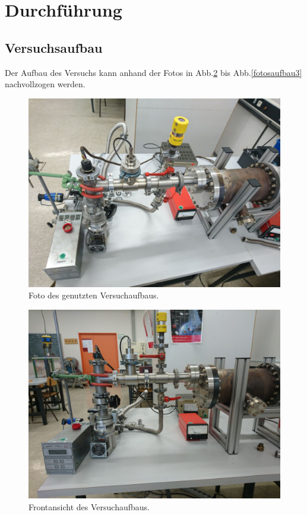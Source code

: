 \section{Durchführung}
\subsection{Versuchsaufbau}
Der Aufbau des Versuchs kann anhand der Fotos in Abb.\ref{fotosaufbau1} bis Abb.\ref{fotosaufbau3} nachvollzogen werden.
\begin{figure}[H]
  \centering
  \includegraphics[scale=0.2]{Bilder/Versuch1.jpg}
  \caption{Foto des genutzten Versuchaufbaus.}
  \label{fotosaufbau1}
\end{figure}

\begin{figure}[H]
  \centering
  \includegraphics[scale=0.2]{Bilder/Versuch2.jpg}
  \caption{Frontansicht des Versuchaufbaus.}
  \label{fotosaufbau1}
\end{figure}

